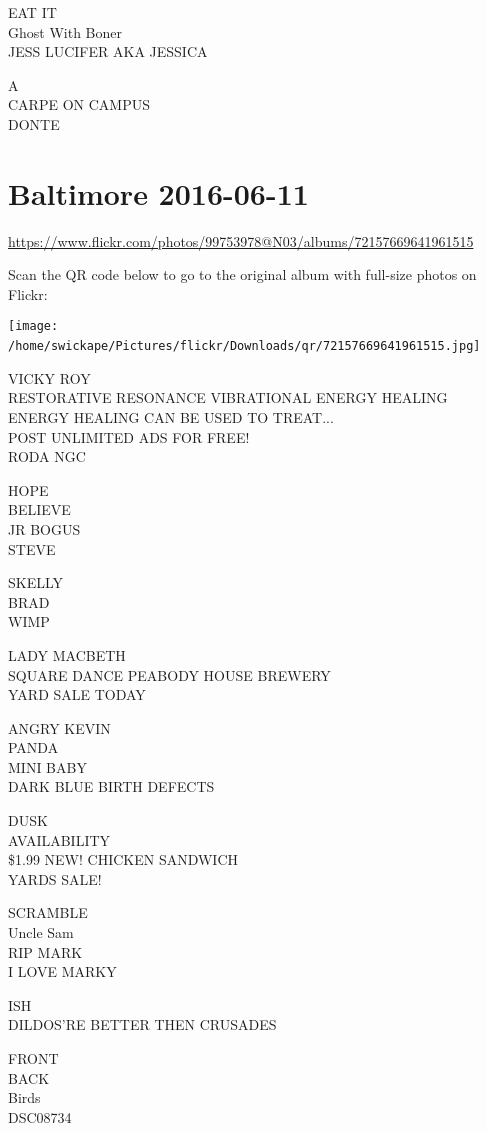 \documentclass[10pt,letterpaper]{article}
\begin{document}
EAT IT\\
Ghost With Boner\\
JESS LUCIFER AKA JESSICA

A\\
CARPE ON CAMPUS\\
DONTE
\

\section*{Baltimore 2016-06-11}

\url{https://www.flickr.com/photos/99753978@N03/albums/72157669641961515}

Scan the QR code below to go to the original album with full-size photos on Flickr:

\texttt{[image: /home/swickape/Pictures/flickr/Downloads/qr/72157669641961515.jpg]}
\

VICKY ROY\\
RESTORATIVE RESONANCE VIBRATIONAL ENERGY HEALING ENERGY HEALING CAN BE USED TO TREAT...\\
POST UNLIMITED ADS FOR FREE!\\
RODA NGC

HOPE\\
BELIEVE\\
JR BOGUS\\
STEVE

SKELLY\\
BRAD\\
WIMP

LADY MACBETH\\
SQUARE DANCE PEABODY HOUSE BREWERY\\
YARD SALE TODAY

ANGRY KEVIN\\
PANDA\\
MINI BABY\\
DARK BLUE BIRTH DEFECTS

DUSK\\
AVAILABILITY\\
\$1.99 NEW!  CHICKEN SANDWICH\\
YARDS SALE!

SCRAMBLE\\
Uncle Sam\\
RIP MARK\\
I LOVE MARKY

ISH\\
DILDOS'RE BETTER THEN CRUSADES

FRONT\\
BACK\\
Birds\\
DSC08734
\end{document}
